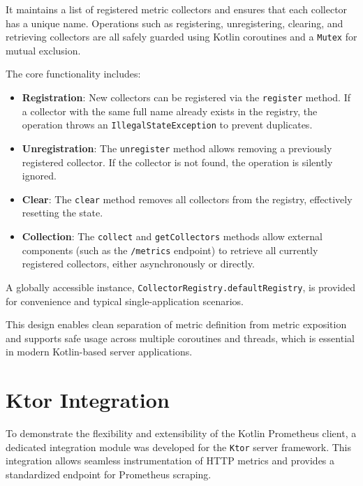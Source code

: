 It maintains a list of registered metric collectors and ensures that each collector has a unique name. Operations such as registering, unregistering, clearing, and retrieving collectors are all safely guarded using Kotlin coroutines and a \texttt{Mutex} for mutual exclusion.

The core functionality includes:
\begin{itemize}
    \item \textbf{Registration}: New collectors can be registered via the \texttt{register} method. If a collector with the same full name already exists in the registry, the operation throws an \texttt{IllegalStateException} to prevent duplicates.
    
    \item \textbf{Unregistration}: The \texttt{unregister} method allows removing a previously registered collector. If the collector is not found, the operation is silently ignored.
    
    \item \textbf{Clear}: The \texttt{clear} method removes all collectors from the registry, effectively resetting the state.
    
    \item \textbf{Collection}: The \texttt{collect} and \texttt{getCollectors} methods allow external components (such as the \texttt{/metrics} endpoint) to retrieve all currently registered collectors, either asynchronously or directly.
\end{itemize}

A globally accessible instance, \texttt{CollectorRegistry.defaultRegistry}, is provided for convenience and typical single-application scenarios.

This design enables clean separation of metric definition from metric exposition and supports safe usage across multiple coroutines and threads, which is essential in modern Kotlin-based server applications.



\section{Ktor Integration}

To demonstrate the flexibility and extensibility of the Kotlin Prometheus client, a dedicated integration module was developed for the \texttt{Ktor} server framework. This integration allows seamless instrumentation of HTTP metrics and provides a standardized endpoint for Prometheus scraping.

